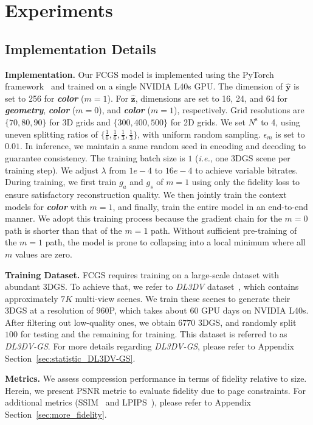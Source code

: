 \documentclass{article} %
\newcommand{\ie}{\textit{i.e.}}
\begin{document}
\section{Experiments}
\subsection{Implementation Details}

\textbf{Implementation.} Our FCGS model is implemented using the PyTorch framework~\citep{pytorch} and trained on a single NVIDIA L40s GPU. The dimension of $\hat{\bm{y}}$ is set to 256 for \textbf{\textit{color}} ($m=1$). For $\hat{\bm{z}}$, dimensions are set to 16, 24, and 64 for \textbf{\textit{geometry}}, \textbf{\textit{color}} ($m=0$), and \textbf{\textit{color}} ($m=1$), respectively. Grid resolutions are $\{70, 80, 90\}$ for 3D grids and $\{300, 400, 500\}$ for 2D grids. We set $N^\text{s}$ to 4, using uneven splitting ratios of $\{\frac{1}{6}, \frac{1}{6}, \frac{1}{3}, \frac{1}{3}\}$, with uniform random sampling. $\epsilon_m$ is set to $0.01$. In inference, we maintain a same random seed in encoding and decoding to guarantee consistency. The training batch size is $1$ (\ie, one 3DGS scene per training step). We adjust $\lambda$ from $1e-4$ to $16e-4$ to achieve variable bitrates.
During training, we first train $g_a$ and $g_s$ of $m=1$ using only the fidelity loss to ensure satisfactory reconstruction quality. We then jointly train the context models for \textbf{\textit{color}} with $m=1$, and finally, train the entire model in an end-to-end manner. We adopt this training process because the gradient chain for the $m=0$ path is shorter than that of the $m=1$ path. Without sufficient pre-training of the $m=1$ path, the model is prone to collapsing into a local minimum where all $m$ values are zero.

\textbf{Training Dataset.} FCGS requires training on a large-scale dataset with abundant 3DGS. To achieve that, we refer to \textit{DL3DV} dataset~\citep{DL3DV}, which contains approximately $7K$ multi-view scenes. We train these scenes to generate their 3DGS at a resolution of $960$P, which takes about $60$ GPU days on NVIDIA L40s. After filtering out low-quality ones, we obtain $6770$ 3DGS, and randomly split $100$ for testing and the remaining for training. This dataset is referred to as \textit{DL3DV-GS}. For more details regarding \textit{DL3DV-GS}, please refer to Appendix Section~\ref{sec:statistic_DL3DV-GS}.

\textbf{Metrics.} We assess compression performance in terms of fidelity relative to size. Herein, we present PSNR metric to evaluate fidelity due to page constraints. For additional metrics (SSIM~\citep{ssim} and LPIPS~\citep{LPIPS}), please refer to Appendix Section~\ref{sec:more_fidelity}.
\end{document}
